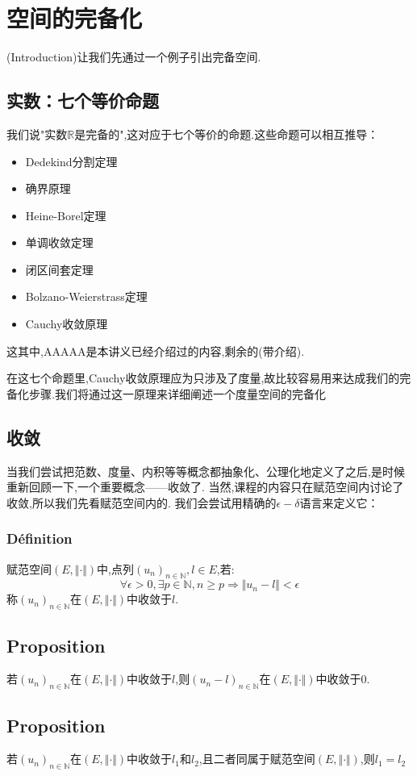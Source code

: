 \documentclass[12pt, a4paper, oneside]{ctexbook}
\newcommand{\R }{\mathbb{R}}%
\begin{document}
\section{空间的完备化}
  (Introduction)让我们先通过一个例子引出完备空间.
  \subsection{实数：七个等价命题}
  我们说"实数$\R$是完备的",这对应于七个等价的命题.这些命题可以相互推导：
  \begin{itemize}
    \item Dedekind分割定理
    \item 确界原理
    \item Heine-Borel定理
    \item 单调收敛定理
    \item 闭区间套定理
    \item Bolzano-Weierstrass定理
    \item Cauchy收敛原理
  \end{itemize}
  这其中,AAAAA是本讲义已经介绍过的内容,剩余的(带介绍).

  在这七个命题里,Cauchy收敛原理应为只涉及了度量,故比较容易用来达成我们的完备化步骤.我们将通过这一原理来详细阐述一个度量空间的完备化
  \subsection{收敛}
  当我们尝试把范数、度量、内积等等概念都抽象化、公理化地定义了之后,是时候重新回顾一下,一个重要概念——收敛了.
  当然,课程的内容只在赋范空间内讨论了收敛,所以我们先看赋范空间内的.
  我们会尝试用精确的$\epsilon-\delta$语言来定义它：
  \subsubsection{Définition}
  赋范空间$(E,\Vert \cdot \Vert)$中,点列$(u_n)_{n\in\mathbb{N}},l\in E$,若:
  $$
    \forall\epsilon>0, \exists p\in \mathbb{N}, n\ge p\Rightarrow \Vert u_n-l \Vert<\epsilon
  $$
  称$(u_n)_{n\in\mathbb{N}}$在$(E,\Vert \cdot \Vert)$中收敛于$l$.
  \subsection{Proposition}
  若$(u_n)_{n\in\mathbb{N}}$在$(E,\Vert \cdot \Vert)$中收敛于$l$,则$(u_n-l)_{n\in\mathbb{N}}$在$(E,\Vert \cdot \Vert)$中收敛于$0$.
  \subsection{Proposition}
  若$(u_n)_{n\in\mathbb{N}}$在$(E,\Vert \cdot \Vert)$中收敛于$l_1$和$l_2$,且二者同属于赋范空间$(E,\Vert \cdot \Vert)$,则$l_1=l_2$
  
\end{document}
